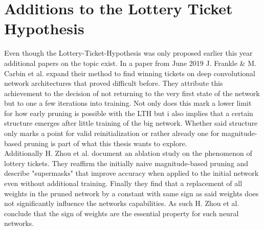 \section{Additions to the Lottery Ticket Hypothesis}
Even though the Lottery-Ticket-Hypothesis was only proposed earlier this year additional papers on the topic exist.
In a paper from June 2019 J. Frankle \& M. Carbin et al. \cite{LTH-At-Scale} expand their method to find winning tickets on deep convolutional network architectures that proved difficult before. They attribute this achievement to the decision of not returning to the very first state of the network but to one a few iterations into training. Not only does this mark a lower limit for how early pruning is possible with the LTH but i also implies that a certain structure emerges after little training of the big network. Whether said structure only marks a point for valid reinitialization or rather already one for magnitude-based pruning is part of what this thesis wants to explore.\\
Additionally H. Zhou et al. \cite{Deconstructing_LTH} document an ablation study on the phenomenon of lottery tickets. They reaffirm the initially naive magnitude-based pruning and describe "supermasks" that improve accuracy when applied to the initial network even without additional training. Finally they find that a replacement of all weights in the pruned network by a constant with same sign as said weights does not significantly influence the networks capabilities. As such H. Zhou et al. conclude that the sign of weights are the essential property for such neural networks. 
